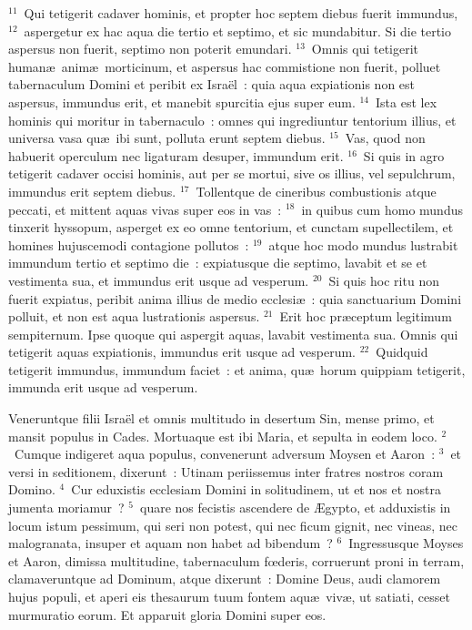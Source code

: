 ${}^{11}$~Qui tetigerit cadaver hominis, et propter hoc septem diebus fuerit immundus,
${}^{12}$~aspergetur ex hac aqua die tertio et septimo, et sic mundabitur. Si die tertio aspersus non fuerit, septimo non poterit emundari.
${}^{13}$~Omnis qui tetigerit human\ae\ anim\ae\ morticinum, et aspersus hac commistione non fuerit, polluet tabernaculum Domini et peribit ex Isra\"el~: quia aqua expiationis non est aspersus, immundus erit, et manebit spurcitia ejus super eum.
${}^{14}$~Ista est lex hominis qui moritur in tabernaculo~: omnes qui ingrediuntur tentorium illius, et universa vasa qu\ae\ ibi sunt, polluta erunt septem diebus.
${}^{15}$~Vas, quod non habuerit operculum nec ligaturam desuper, immundum erit.
${}^{16}$~Si quis in agro tetigerit cadaver occisi hominis, aut per se mortui, sive os illius, vel sepulchrum, immundus erit septem diebus.
${}^{17}$~Tollentque de cineribus combustionis atque peccati, et mittent aquas vivas super eos in vas~:
${}^{18}$~in quibus cum homo mundus tinxerit hyssopum, asperget ex eo omne tentorium, et cunctam supellectilem, et homines hujuscemodi contagione pollutos~:
${}^{19}$~atque hoc modo mundus lustrabit immundum tertio et septimo die~: expiatusque die septimo, lavabit et se et vestimenta sua, et immundus erit usque ad vesperum.
${}^{20}$~Si quis hoc ritu non fuerit expiatus, peribit anima illius de medio ecclesi\ae~: quia sanctuarium Domini polluit, et non est aqua lustrationis aspersus.
${}^{21}$~Erit hoc pr\ae ceptum legitimum sempiternum. Ipse quoque qui aspergit aquas, lavabit vestimenta sua. Omnis qui tetigerit aquas expiationis, immundus erit usque ad vesperum.
${}^{22}$~Quidquid tetigerit immundus, immundum faciet~: et anima, qu\ae\ horum quippiam tetigerit, immunda erit usque ad vesperum.

\lettrine[lines=3,image=true,loversize=0.05,lraise=-0.03]{V}{}eneruntque filii Isra\"el et omnis multitudo in desertum Sin, mense primo, et mansit populus in Cades. Mortuaque est ibi Maria, et sepulta in eodem loco.
${}^{2}$~Cumque indigeret aqua populus, convenerunt adversum Moysen et Aaron~:
${}^{3}$~et versi in seditionem, dixerunt~: Utinam periissemus inter fratres nostros coram Domino.
${}^{4}$~Cur eduxistis ecclesiam Domini in solitudinem, ut et nos et nostra jumenta moriamur~?
${}^{5}$~quare nos fecistis ascendere de \AE gypto, et adduxistis in locum istum pessimum, qui seri non potest, qui nec ficum gignit, nec vineas, nec malogranata, insuper et aquam non habet ad bibendum~?
${}^{6}$~Ingressusque Moyses et Aaron, dimissa multitudine, tabernaculum fœderis, corruerunt proni in terram, clamaveruntque ad Dominum, atque dixerunt~: Domine Deus, audi clamorem hujus populi, et aperi eis thesaurum tuum fontem aqu\ae\ viv\ae , ut satiati, cesset murmuratio eorum. Et apparuit gloria Domini super eos.



